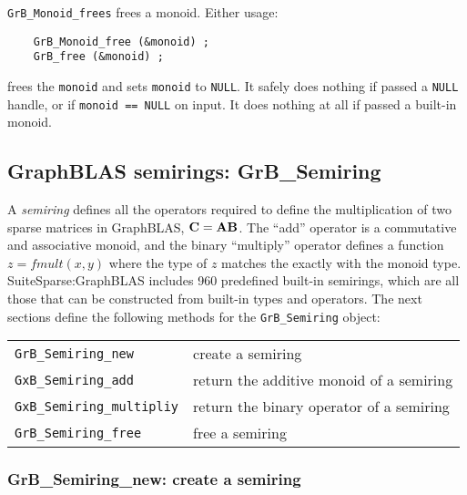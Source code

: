 \documentclass[12pt]{article}
\begin{document}
\verb'GrB_Monoid_frees' frees a monoid.  Either usage:

    {\small
    \begin{verbatim}
    GrB_Monoid_free (&monoid) ;
    GrB_free (&monoid) ; \end{verbatim}}

\noindent
frees the \verb'monoid' and sets \verb'monoid' to \verb'NULL'.  It safely does
nothing if passed a \verb'NULL' handle, or if \verb'monoid == NULL' on input.
It does nothing at all if passed a built-in monoid.

\newpage
\subsection{GraphBLAS semirings: {\sf GrB\_Semiring}} %
\label{semiring}

A {\em semiring} defines all the operators required to define the
multiplication of two sparse matrices in GraphBLAS, ${\bf C=AB}$.  The ``add''
operator is a commutative and associative monoid, and the binary ``multiply''
operator defines a function $z=fmult(x,y)$ where the type of $z$ matches the
exactly with the monoid type.  SuiteSparse:GraphBLAS includes 960
predefined built-in semirings, which are all those that can be constructed
from built-in types and operators.  The next sections define the following
methods for the \verb'GrB_Semiring' object:

\vspace{0.2in}
{\footnotesize
\begin{tabular}{ll}
\hline
\verb'GrB_Semiring_new'       & create a semiring \\
\verb'GxB_Semiring_add'       & return the additive monoid of a semiring \\
\verb'GxB_Semiring_multipliy' & return the binary operator of a semiring \\
\verb'GrB_Semiring_free'      & free a semiring \\
\hline
\end{tabular}
}
\vspace{0.2in}

\subsubsection{{\sf GrB\_Semiring\_new:} create a semiring}
\label{semiring_new}
\end{document}
